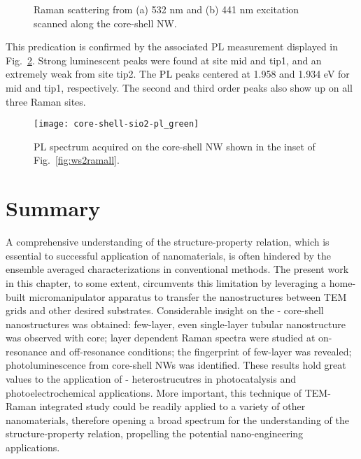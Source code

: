 \begin{figure}[htb]
\centering
{}\hspace{0.04\textwidth}
\caption[Raman scattering from (a) 532 nm and (b) 441 nm excitation scanned along the core-shell NW]{Raman scattering from (a) 532 nm and (b) 441 nm excitation scanned along the core-shell NW.}
\label{fig:ws2ram3site}
\end{figure}
This predication is confirmed by the associated PL measurement displayed in Fig.~\ref{fig:ws2plgreen}. Strong luminescent peaks were found at site mid and tip1, and an extremely weak from site tip2. The PL peaks centered at 1.958 and 1.934 eV for mid and tip1, respectively. The second and third order peaks also show up on all three Raman sites. 
\begin{figure}[htb]
\centering
\texttt{[image: core-shell-sio2-pl\_green]}
\caption[PL spectra of - on -Si]{PL spectrum acquired on the core-shell NW shown in the inset of Fig.~\ref{fig:ws2ramall}.}
\label{fig:ws2plgreen}
\end{figure}

\section{Summary} 

A comprehensive understanding of the structure-property relation, which is essential to successful application of nanomaterials, is often hindered by the ensemble averaged characterizations in conventional methods. The present work in this chapter, to some extent, circumvents this limitation by leveraging a home-built micromanipulator apparatus to transfer the nanostructures between TEM grids and other desired substrates. Considerable insight on the - core-shell nanostructures was obtained: few-layer, even single-layer tubular  nanostructure was observed with  core; layer dependent Raman spectra were studied at on-resonance and off-resonance conditions; the fingerprint of few-layer  was revealed; photoluminescence from core-shell NWs was identified. These results hold great values to the application of - heterostrucutres in photocatalysis and photoelectrochemical applications. More important, this technique of TEM-Raman integrated study could be readily applied to a variety of other nanomaterials, therefore opening a broad spectrum for the understanding of the structure-property relation, propelling the potential nano-engineering applications. 

